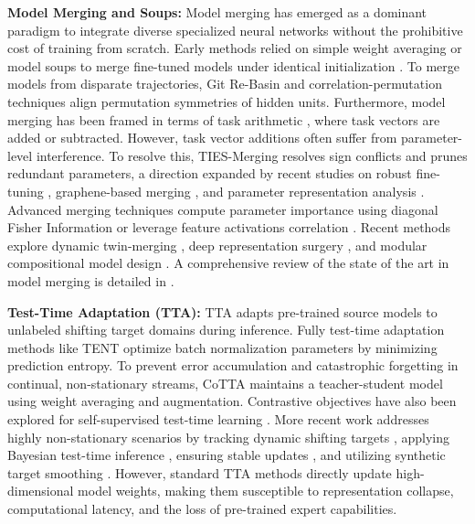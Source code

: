 \documentclass{article}
\theoremstyle{plain}
\theoremstyle{definition}
\theoremstyle{remark}
\begin{document}
\textbf{Model Merging and Soups:} 
Model merging has emerged as a dominant paradigm to integrate diverse specialized neural networks without the prohibitive cost of training from scratch. Early methods relied on simple weight averaging or model soups to merge fine-tuned models under identical initialization \cite{wortsman2022modelsoups, dansereau2023modelsoups, suzuki2022modelsoups, maron2022modelsoups}. 
To merge models from disparate trajectories, Git Re-Basin \cite{ainsworth2022gitrebasin} and correlation-permutation techniques \cite{rittergutierrez2025correlationpermutationapproach} align permutation symmetries of hidden units. 
Furthermore, model merging has been framed in terms of task arithmetic \cite{task_arithmetic}, where task vectors are added or subtracted. 
However, task vector additions often suffer from parameter-level interference. 
To resolve this, TIES-Merging \cite{yadav2023tiesmergingresolving} resolves sign conflicts and prunes redundant parameters, a direction expanded by recent studies on robust fine-tuning \cite{yadav2025robustfinetuning}, graphene-based merging \cite{yadav2026merginggraphene}, and parameter representation analysis \cite{wu2025parameterrepresentation}. 
Advanced merging techniques compute parameter importance using diagonal Fisher Information \cite{fisher_merging} or leverage feature activations correlation \cite{regmean}. 
Recent methods explore dynamic twin-merging \cite{lu2024twinmergingdynamic}, deep representation surgery \cite{yang2024surgeryv2bridging, lv2025deepmerge}, and modular compositional model design \cite{ladwig2023modularcompositional}. 
A comprehensive review of the state of the art in model merging is detailed in \cite{wang2025modelmerging, yadav2024whatmatters, zhou2025mixupmodel, ueda2025mergingcontinual}.

\textbf{Test-Time Adaptation (TTA):} 
TTA adapts pre-trained source models to unlabeled shifting target domains during inference. 
Fully test-time adaptation methods like TENT \cite{tent, wang2021tentfully} optimize batch normalization parameters by minimizing prediction entropy. 
To prevent error accumulation and catastrophic forgetting in continual, non-stationary streams, CoTTA \cite{cotta} maintains a teacher-student model using weight averaging and augmentation. 
Contrastive objectives have also been explored for self-supervised test-time learning \cite{chen2022contrastivetesttime}. 
More recent work addresses highly non-stationary scenarios by tracking dynamic shifting targets \cite{yuan2023robusttesttime, kim2025battlingnonstationarity}, applying Bayesian test-time inference \cite{zhou2025bayesiantesttime}, ensuring stable updates \cite{niu2023towardsstable, lee2024entropyis, karmanov2024efficienttesttime}, and utilizing synthetic target smoothing \cite{guo2025smoothingshift, guo2025everythingsynthetic}. 
However, standard TTA methods directly update high-dimensional model weights, making them susceptible to representation collapse, computational latency, and the loss of pre-trained expert capabilities.
\end{document}

